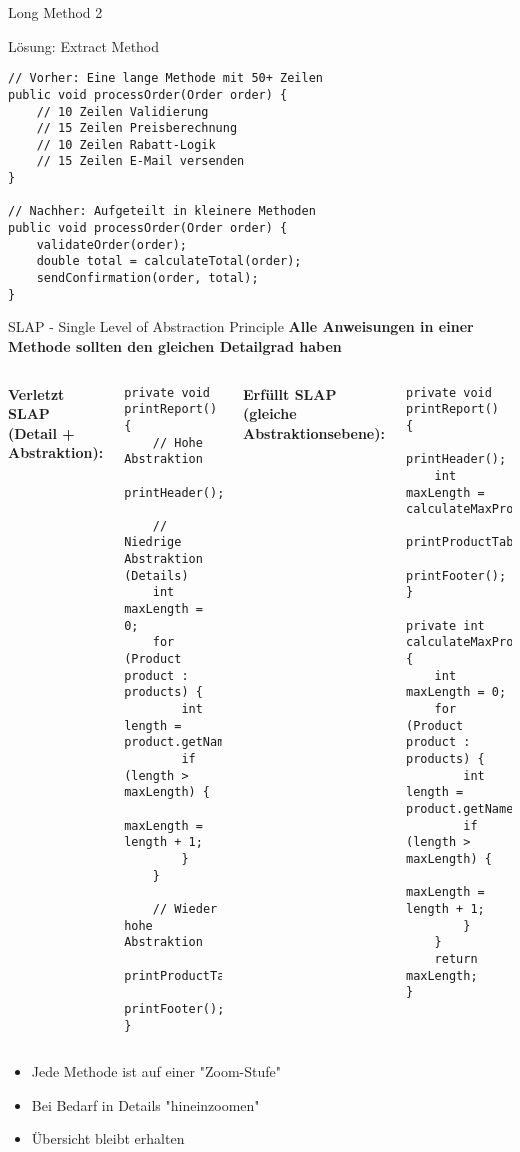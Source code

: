 \begin{frame}[fragile]{Long Method 2}
  \begin{exampleblock}{Lösung: Extract Method}
    \begin{lstlisting}[style=java, basicstyle=\footnotesize\ttfamily]
// Vorher: Eine lange Methode mit 50+ Zeilen
public void processOrder(Order order) {
    // 10 Zeilen Validierung
    // 15 Zeilen Preisberechnung
    // 10 Zeilen Rabatt-Logik
    // 15 Zeilen E-Mail versenden
}

// Nachher: Aufgeteilt in kleinere Methoden
public void processOrder(Order order) {
    validateOrder(order);
    double total = calculateTotal(order);
    sendConfirmation(order, total);
}
    \end{lstlisting}
  \end{exampleblock}
\end{frame}

\begin{frame}[fragile]{SLAP - Single Level of Abstraction Principle}
  \textbf{Alle Anweisungen in einer Methode sollten den gleichen Detailgrad haben}

  \begin{columns}[T]
    \textbf{Verletzt SLAP (Detail + Abstraktion):}
    \begin{lstlisting}[style=java, basicstyle=\tiny\ttfamily]
private void printReport() {
    // Hohe Abstraktion
    printHeader();

    // Niedrige Abstraktion (Details)
    int maxLength = 0;
    for (Product product : products) {
        int length = product.getName().length();
        if (length > maxLength) {
            maxLength = length + 1;
        }
    }

    // Wieder hohe Abstraktion
    printProductTable(maxLength);
    printFooter();
}
    \end{lstlisting}

    \textbf{Erfüllt SLAP (gleiche Abstraktionsebene):}
    \begin{lstlisting}[style=java, basicstyle=\tiny\ttfamily]
private void printReport() {
    printHeader();
    int maxLength = calculateMaxProductNameLength();
    printProductTable(maxLength);
    printFooter();
}

private int calculateMaxProductNameLength() {
    int maxLength = 0;
    for (Product product : products) {
        int length = product.getName().length();
        if (length > maxLength) {
            maxLength = length + 1;
        }
    }
    return maxLength;
}
    \end{lstlisting}
  \end{columns}

  \begin{itemize}
    \item Jede Methode ist auf einer "Zoom-Stufe"
    \item Bei Bedarf in Details "hineinzoomen"
    \item Übersicht bleibt erhalten
  \end{itemize}
\end{frame}

